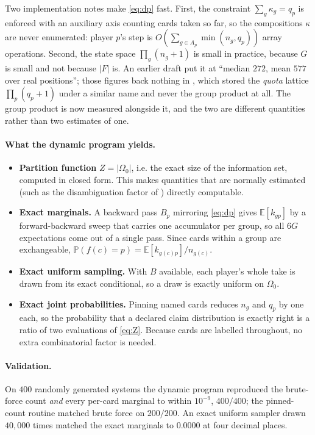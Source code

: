 \documentclass[11pt,a4paper]{article}
\newcommand{\Prob}{\ensuremath{\mathbb{P}}}
\newcommand{\Ex}{\ensuremath{\mathbb{E}}}
\begin{document}
Two implementation notes make \eqref{eq:dp} fast. First, the constraint
$\sum_g \kappa_g = q_p$ is enforced with an auxiliary axis counting cards taken
so far, so the compositions $\kappa$ are never enumerated: player $p$'s step is
$O(\sum_{g \in A_p} \min(n_g,q_p))$ array operations. Second, the state space
$\prod_g (n_g+1)$ is small in practice, because $G$ is small and not because
$|F|$ is. An earlier draft put it at ``median $272$, mean $577$ over real
positions''; those figures back nothing in
, which stored the \emph{quota}
lattice $\prod_p (q_p+1)$ under a similar name and never the group product at
all. The group product is now measured alongside it, and the two are different
quantities rather than two estimates of one.

\paragraph{What the dynamic program yields.}
\begin{itemize}
\item \textbf{Partition function} $Z = |\Omega_0|$, i.e. the exact size of the
information set, computed in closed form. This makes quantities that are
normally estimated (such as the disambiguation factor of
\citealp{long2010understanding}) directly computable.
\item \textbf{Exact marginals.} A backward pass $B_p$ mirroring \eqref{eq:dp}
gives $\Ex[k_{gp}]$ by a forward-backward sweep that carries one accumulator
per group, so all $6G$ expectations come out of a single pass. Since cards
within a group are exchangeable,
$\Prob(f(c) = p) = \Ex[k_{g(c)p}] / n_{g(c)}$.
\item \textbf{Exact uniform sampling.} With $B$ available, each player's whole
take is drawn from its exact conditional, so a draw is exactly uniform on
$\Omega_0$.
\item \textbf{Exact joint probabilities.} Pinning named cards reduces $n_g$ and
$q_p$ by one each, so the probability that a declared claim distribution is
exactly right is a ratio of two evaluations of \eqref{eq:Z}. Because cards are
labelled throughout, no extra combinatorial factor is needed.
\end{itemize}

\paragraph{Validation.} On $400$ randomly generated systems the dynamic program
reproduced the brute-force count \emph{and} every per-card marginal to within
$10^{-9}$, $400/400$; the pinned-count routine matched brute force on $200/200$.
An exact uniform sampler drawn $40{,}000$ times matched the exact marginals to
$0.0000$ at four decimal places.
\end{document}
